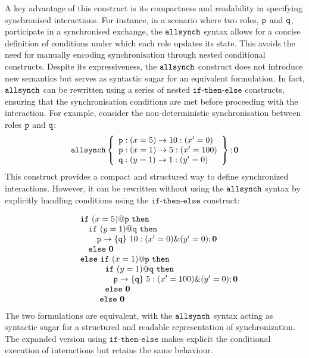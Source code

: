 \begin{itemize}
  A key advantage of this construct is its compactness and readability
  in specifying synchronised interactions. For instance, in a scenario
  where two roles, $\mathtt{p}$ and $\mathtt{q}$, participate in a
  synchronised exchange, the $\mathtt{allsynch}$ syntax allows for a
  concise definition of conditions under which each role updates its
  state. This avoids the need for manually encoding synchronisation
  through nested conditional constructs.
  Despite its expressiveness, the $\mathtt{allsynch}$ construct does not
  introduce new semantics but serves as syntactic sugar for an
  equivalent formulation.  In fact, $\mathtt{allsynch}$ can be rewritten
  using a series of nested $\mathtt{if\text{-}then\text{-}else}$
  constructs, ensuring that the synchronisation conditions are met
  before proceeding with the interaction. For example, consider the
  non-deterministic synchronisation between roles $\mathtt{p}$ and
  $\mathtt{q}$: 
  \begin{displaymath}
    \mathtt{allsynch}\left\{
      \begin{array}{lll}
        \mathtt{p} : (x=5) \rightarrow 10 : (x'=0) \\
        \mathtt{p} : (x=1) \rightarrow 5 : (x'=100) \\
        \mathtt{q} : (y=1) \rightarrow 1 : (y'=0)
      \end{array}
    \right\} ; \mathbf{0}
  \end{displaymath}
  This construct provides a compact and structured way to define
  synchronized interactions. However, it can be rewritten without
  using the $\mathtt{allsynch}$ syntax by explicitly handling conditions
  using the $\mathtt{if\text{-}then\text{-}else}$ construct:
  
  \begin{displaymath}
    \begin{array}{ll}
      & \mathtt{if}\ (x=5)@\mathtt{p}\ \mathtt{then}\\
      & \quad \mathtt{if}\ (y=1)@\mathtt{q}\ \mathtt{then}\\
      & \quad \quad \mathtt{p}\rightarrow \{\mathtt{q}\}\ 10 : (x'=0)\&(y'=0);\mathbf{0} \\
      & \quad \mathtt{else}\ \mathbf{0} \\
      & \mathtt{else}\ \mathtt{if}\ (x=1)@\mathtt{p}\ \mathtt{then}\\
      & \qquad\quad \mathtt{if}\ (y=1)@\mathtt{q}\ \mathtt{then}\\
      & \qquad\quad \quad \mathtt{p}\rightarrow \{\mathtt{q}\}\ 5 : (x'=100)\&(y'=0);\mathbf{0} \\
      & \qquad\quad \mathtt{else}\ \mathbf{0} \\
      & \qquad\ \mathtt{else}\ \mathbf{0} \\
    \end{array}
  \end{displaymath}
  The two formulations are equivalent, with the $\mathtt{allsynch}$ syntax
  acting as syntactic sugar for a structured and readable
  representation of synchronization. The expanded version using
  $\mathtt{if\text{-}then\text{-}else}$ makes explicit the conditional
  execution of interactions but retains the same behaviour.


\end{itemize}
